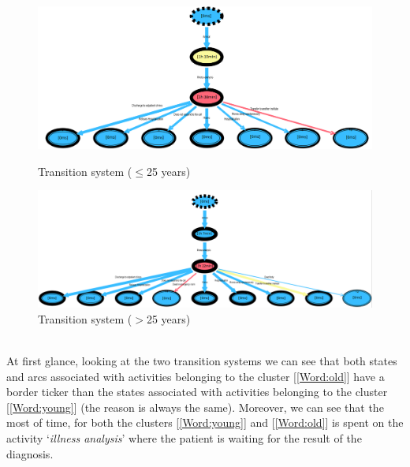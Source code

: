 \begin{figure} [htbp]
\includegraphics[width=\textwidth , keepaspectratio]{ProntoSoccorsoSojournYoungs}
\caption{Transition system ($\leq$25 years)}
\includegraphics[width=\textwidth , keepaspectratio]{ProntoSoccorsoSojournOlds}
\caption{Transition system ($>$25 years)}
\end{figure} \\
At first glance, looking at the two transition systems we can see that both states and arcs associated with activities belonging to the cluster [\ref{Word:old}] have a border ticker than the states associated with activities belonging to the cluster [\ref{Word:young}] (the reason is always the same). Moreover, we can see that the most of time, for both the clusters [\ref{Word:young}] and [\ref{Word:old}] is spent on the activity `\textit{illness analysis}' where the patient is waiting for the result of the diagnosis.
\clearpage
